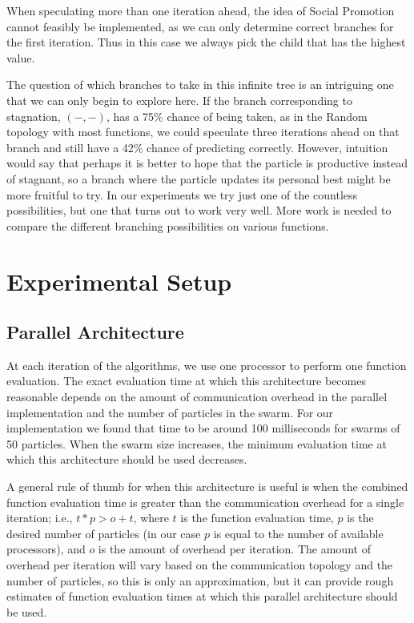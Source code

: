 \documentclass[smallcondensed]{svjour3}
\providecommand{\casepn}{\ensuremath{(-,-)}}
\begin{document}
When speculating more than one iteration ahead, the idea of Social Promotion
cannot feasibly be implemented, as we can only determine correct branches for
the first iteration.  Thus in this case we always pick the child that has the
highest value.

The question of which branches to take in this infinite tree is an intriguing
one that we can only begin to explore here.  If the branch corresponding to
stagnation, \casepn, has a 75\% chance of being taken, as in the Random
topology with most functions, we could speculate three iterations ahead on that
branch and still have a 42\% chance of predicting correctly.  However,
intuition would say that perhaps it is better to hope that the particle is
productive instead of stagnant, so a branch where the particle updates its
personal best might be more fruitful to try.  In our experiments we try just
one of the countless possibilities, but one that turns out to work very well.
More work is needed to compare the different branching possibilities on various
functions.

\section{Experimental Setup}
\label{sec:setup}

\subsection{Parallel Architecture}

At each iteration of the algorithms, we use one processor to perform one
function evaluation.  The exact evaluation time at which this architecture
becomes reasonable depends on the amount of communication overhead in the
parallel implementation and the number of particles in the swarm.  For our
implementation we found that time to be around 100 milliseconds for swarms of
50 particles.  When the swarm size increases, the minimum evaluation time at
which this architecture should be used decreases.

A general rule of thumb for when this architecture is useful is when the
combined function evaluation time is greater than the communication overhead
for a single iteration; i.e., $t*p > o+t$, where $t$ is the function evaluation
time, $p$ is the desired number of particles (in our case $p$ is equal to the
number of available processors), and $o$ is the amount of overhead per
iteration.  The amount of overhead per iteration will vary based on the
communication topology and the number of particles, so this is only an
approximation, but it can provide rough estimates of function evaluation times
at which this parallel architecture should be used.
\end{document}
